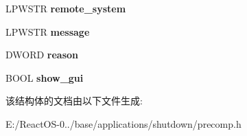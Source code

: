 \begin{DoxyCompactItemize}
L\+P\+W\+S\+TR {\bfseries remote\+\_\+system}
\item 
\mbox{\label{struct_command_line_options_a5e8a26ba61738851bc92faf3396d81fe}} 
L\+P\+W\+S\+TR {\bfseries message}
\item 
\mbox{\label{struct_command_line_options_a1deaed218c74a20650f530202796680a}} 
D\+W\+O\+RD {\bfseries reason}
\item 
\mbox{\label{struct_command_line_options_a8835060496414b8e23c04a33ae24dd50}} 
B\+O\+OL {\bfseries show\+\_\+gui}
\end{DoxyCompactItemize}


该结构体的文档由以下文件生成\+:\begin{DoxyCompactItemize}
\item 
E\+:/\+React\+O\+S-\/0../base/applications/shutdown/precomp.\+h\end{DoxyCompactItemize}
